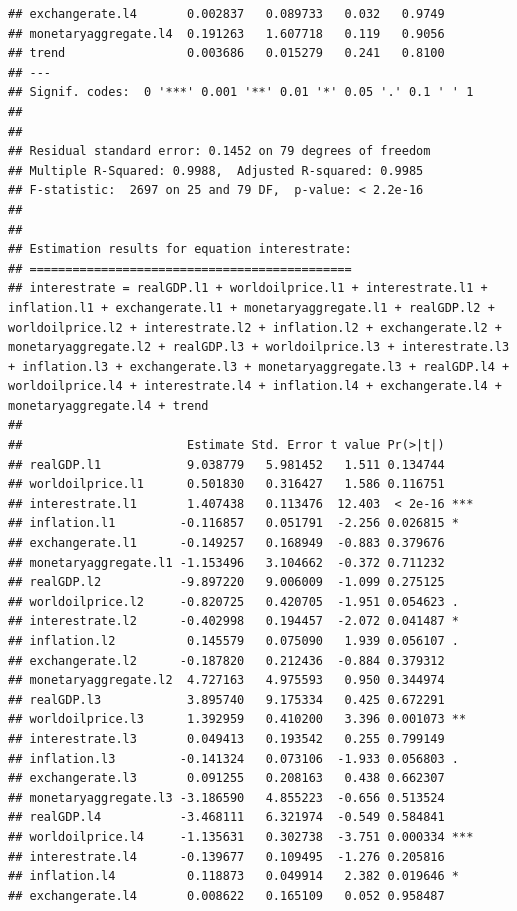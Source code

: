 \documentclass[11pt,preprint, authoryear]{elsarticle}
\numberwithin{equation}{section}
\numberwithin{figure}{section}
\numberwithin{table}{section}
\begin{document}
\begin{verbatim}
## exchangerate.l4       0.002837   0.089733   0.032   0.9749    
## monetaryaggregate.l4  0.191263   1.607718   0.119   0.9056    
## trend                 0.003686   0.015279   0.241   0.8100    
## ---
## Signif. codes:  0 '***' 0.001 '**' 0.01 '*' 0.05 '.' 0.1 ' ' 1
## 
## 
## Residual standard error: 0.1452 on 79 degrees of freedom
## Multiple R-Squared: 0.9988,  Adjusted R-squared: 0.9985 
## F-statistic:  2697 on 25 and 79 DF,  p-value: < 2.2e-16 
## 
## 
## Estimation results for equation interestrate: 
## ============================================= 
## interestrate = realGDP.l1 + worldoilprice.l1 + interestrate.l1 + inflation.l1 + exchangerate.l1 + monetaryaggregate.l1 + realGDP.l2 + worldoilprice.l2 + interestrate.l2 + inflation.l2 + exchangerate.l2 + monetaryaggregate.l2 + realGDP.l3 + worldoilprice.l3 + interestrate.l3 + inflation.l3 + exchangerate.l3 + monetaryaggregate.l3 + realGDP.l4 + worldoilprice.l4 + interestrate.l4 + inflation.l4 + exchangerate.l4 + monetaryaggregate.l4 + trend 
## 
##                       Estimate Std. Error t value Pr(>|t|)    
## realGDP.l1            9.038779   5.981452   1.511 0.134744    
## worldoilprice.l1      0.501830   0.316427   1.586 0.116751    
## interestrate.l1       1.407438   0.113476  12.403  < 2e-16 ***
## inflation.l1         -0.116857   0.051791  -2.256 0.026815 *  
## exchangerate.l1      -0.149257   0.168949  -0.883 0.379676    
## monetaryaggregate.l1 -1.153496   3.104662  -0.372 0.711232    
## realGDP.l2           -9.897220   9.006009  -1.099 0.275125    
## worldoilprice.l2     -0.820725   0.420705  -1.951 0.054623 .  
## interestrate.l2      -0.402998   0.194457  -2.072 0.041487 *  
## inflation.l2          0.145579   0.075090   1.939 0.056107 .  
## exchangerate.l2      -0.187820   0.212436  -0.884 0.379312    
## monetaryaggregate.l2  4.727163   4.975593   0.950 0.344974    
## realGDP.l3            3.895740   9.175334   0.425 0.672291    
## worldoilprice.l3      1.392959   0.410200   3.396 0.001073 ** 
## interestrate.l3       0.049413   0.193542   0.255 0.799149    
## inflation.l3         -0.141324   0.073106  -1.933 0.056803 .  
## exchangerate.l3       0.091255   0.208163   0.438 0.662307    
## monetaryaggregate.l3 -3.186590   4.855223  -0.656 0.513524    
## realGDP.l4           -3.468111   6.321974  -0.549 0.584841    
## worldoilprice.l4     -1.135631   0.302738  -3.751 0.000334 ***
## interestrate.l4      -0.139677   0.109495  -1.276 0.205816    
## inflation.l4          0.118873   0.049914   2.382 0.019646 *  
## exchangerate.l4       0.008622   0.165109   0.052 0.958487    

\end{verbatim}
\end{document}

